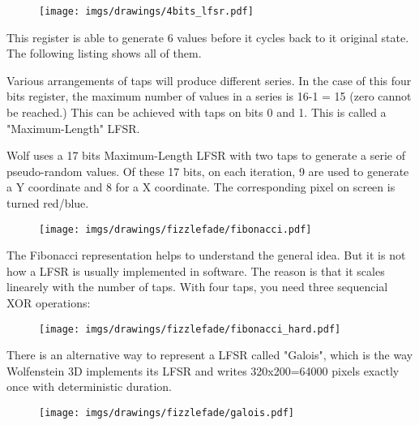 \begin{figure}[H]
 \centering
  \texttt{[image: imgs/drawings/4bits\_lfsr.pdf]}
\end{figure}
This register is able to generate 6 values before it cycles back to it original state. The following listing shows all of them.\\
\par
\begin{minipage}{\textwidth}

\end{minipage}
\par
Various arrangements of taps will produce different series. In the case of this four bits register, the maximum number of values in a series is 16-1 = 15 (zero cannot be reached.) This can be achieved with taps on bits 0 and 1. This is called a "Maximum-Length" LFSR.\\
\par
\begin{minipage}{\textwidth}

\end{minipage}
\par
\par
Wolf uses a 17 bits Maximum-Length LFSR with two taps to generate a serie of pseudo-random values. Of these 17 bits, on each iteration, 9 are used to generate a Y coordinate and 8 for a X coordinate. The corresponding pixel on screen is turned red/blue.\\
\par
\begin{figure}[H] \centering \texttt{[image: imgs/drawings/fizzlefade/fibonacci.pdf]} \end{figure}
\par
The Fibonacci representation helps to understand the general idea. But it is not how a LFSR is usually implemented in software. The reason is that it scales linearely with the number of taps. With four taps, you need three sequencial XOR operations:
\par
\begin{figure}[H] \centering \texttt{[image: imgs/drawings/fizzlefade/fibonacci\_hard.pdf]} \end{figure}
\par
There is an alternative way to represent a LFSR called "Galois", which is the way Wolfenstein 3D implements its LFSR and writes 320x200=64000 pixels exactly once with deterministic duration.
\par
\begin{figure}[H] \centering \texttt{[image: imgs/drawings/fizzlefade/galois.pdf]} \end{figure}
      

